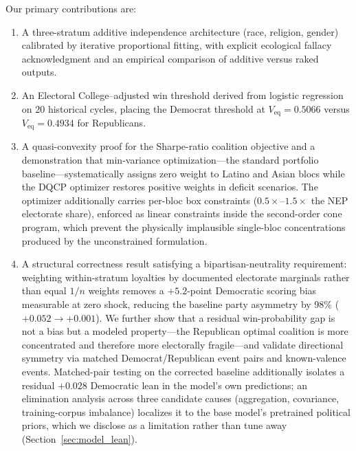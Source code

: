 \documentclass[12pt, letterpaper]{article}
\theoremstyle{definition}
\newcommand{\Veq}{V_{\mathrm{eq}}}
\begin{document}
Our primary contributions are:

\begin{enumerate}
  \item A three-stratum additive independence architecture (race, religion, gender)
        calibrated by iterative proportional fitting, with explicit ecological
        fallacy acknowledgment and an empirical comparison of additive versus
        raked outputs.

  \item An Electoral College--adjusted win threshold derived from logistic regression
        on 20 historical cycles, placing the Democrat threshold at $\Veq = 0.5066$
        versus $\Veq = 0.4934$ for Republicans.

  \item A quasi-convexity proof for the Sharpe-ratio coalition objective and a
        demonstration that min-variance optimization---the standard portfolio
        baseline---systematically assigns zero weight to Latino and Asian blocs
        while the DQCP optimizer restores positive weights in deficit scenarios.
        The optimizer additionally carries per-bloc box constraints
        ($0.5 \times$--$1.5 \times$ the NEP electorate share), enforced as linear
        constraints inside the second-order cone program, which prevent the
        physically implausible single-bloc concentrations produced by the
        unconstrained formulation.

  \item A structural correctness result satisfying a bipartisan-neutrality
        requirement: weighting within-stratum loyalties by documented electorate
        marginals rather than equal $1/n$ weights removes a $+5.2$-point Democratic
        scoring bias measurable at zero shock, reducing the baseline party
        asymmetry by 98\% ($+0.052 \rightarrow +0.001$). We further show that a
        residual win-probability gap is not a bias but a modeled property---the
        Republican optimal coalition is more concentrated and therefore more
        electorally fragile---and validate directional symmetry via matched
        Democrat/Republican event pairs and known-valence events. Matched-pair
        testing on the corrected baseline additionally isolates a residual
        $+0.028$ Democratic lean in the model's own predictions; an elimination
        analysis across three candidate causes (aggregation, covariance,
        training-corpus imbalance) localizes it to the base model's pretrained
        political priors, which we disclose as a limitation rather than tune
        away (Section~\ref{sec:model_lean}).


\end{enumerate}
\end{document}
